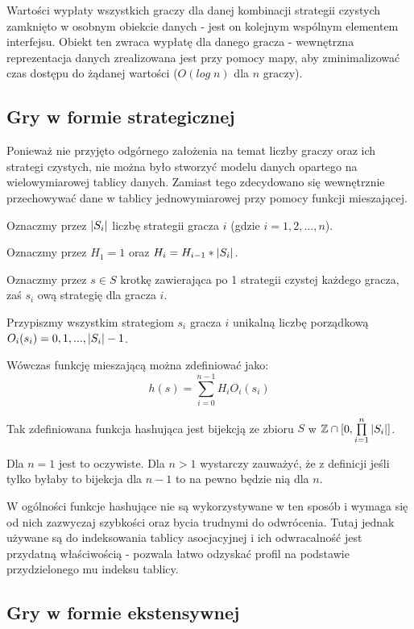 \documentclass[polish]{standalone}
\begin{document}
Wartości wypłaty wszystkich graczy dla danej kombinacji strategii czystych zamknięto w osobnym obiekcie danych - jest on
kolejnym wspólnym elementem interfejsu. Obiekt ten zwraca wypłatę dla danego gracza - wewnętrzna reprezentacja danych
zrealizowana jest przy pomocy mapy, aby zminimalizować czas dostępu do żądanej wartości ($O(log\;n)$ dla $n$ graczy).

\subsection{Gry w formie strategicznej}

Ponieważ nie przyjęto odgórnego założenia na temat liczby graczy oraz ich strategi czystych, nie można było stworzyć
modelu danych opartego na wielowymiarowej tablicy danych. Zamiast tego zdecydowano się wewnętrznie przechowywać dane
w tablicy jednowymiarowej przy pomocy funkcji mieszającej.

Oznaczmy przez $|S_i|$ liczbę strategii gracza $i$ (gdzie $i = 1, 2, ..., n$).

Oznaczmy przez $H_1 = 1$ oraz $H_i = H_{i-1} * |S_i|$.

Oznaczmy przez $s \in S$ krotkę zawierająca po 1 strategii czystej każdego gracza, zaś $s_i$ ową strategię
dla gracza $i$.

Przypiszmy wszystkim strategiom $s_i$ gracza $i$ unikalną liczbę porządkową $O_i(s_i) = 0, 1, ..., |S_i|-1$.

Wówczas funkcję mieszającą można zdefiniować jako:
$$h(s) = \sum\limits_{i=0}^{n-1} H_i O_i(s_i)$$

\begin{theorem}
Tak zdefiniowana funkcja hashująca jest bijekcją ze zbioru $S$ w $ \mathbb{Z} \cap [0, \prod\limits_{i=1}^{n} |S_i|] $.
\end{theorem}

Dla $n = 1$ jest to oczywiste. Dla $n > 1$ wystarczy zauważyć, że z definicji jeśli tylko byłaby to bijekcja dla $n-1$
to na pewno będzie nią dla $n$.

W ogólności funkcje hashujące nie są wykorzystywane w ten sposób i wymaga się od nich zazwyczaj szybkości oraz bycia
trudnymi do odwrócenia. Tutaj jednak używane są do indeksowania tablicy asocjacyjnej i ich odwracalność jest przydatną
właściwością - pozwala łatwo odzyskać profil na podstawie przydzielonego mu indeksu tablicy.

\subsection{Gry w formie ekstensywnej}
\end{document}
